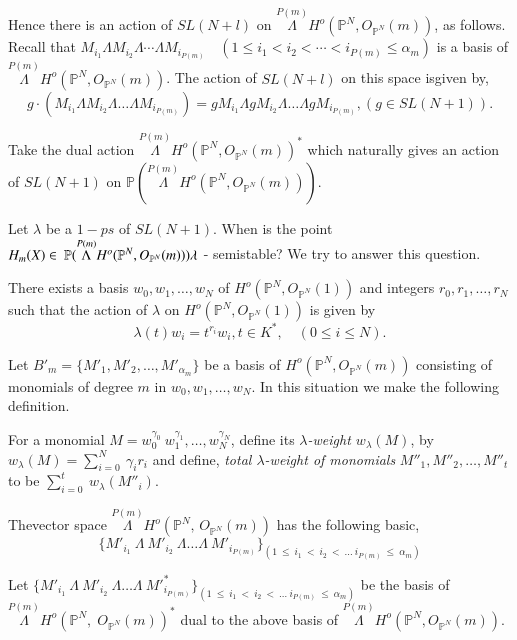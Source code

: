{\begin{subdefin}
Hence there is an action of $SL(N+l)$ on $\overset{P(m)}{\Lambda}
H^o(\mathbb{P}^N, O_{\mathbb{P}^N}(m))$, as follows. Recall that
$M_{i_1} \Lambda M_{i_2} \Lambda \cdots \Lambda M_{i_{P(m)}} \quad (1
\le i_1 < i_2 < \cdots < i_{P(m)} \le \alpha_m)$ is a basis of
$\overset{P(m)}{\Lambda} H^o(\mathbb{P}^N,O_{\mathbb{P}^N}(m))$. The
action of $SL(N+l)$ on this space is\pageoriginale given by, 
$$
g \cdot (M_{i_1} \Lambda M_{i_2} \Lambda \dots \Lambda M_{i_{P(m)}}) =
gM_{i_1} \Lambda  gM_{i_2} \Lambda \dots \Lambda
gM_{i_{P(m)}}, (g \in SL(N+1)). 
$$

Take the dual action $\overset{P(m)}{\Lambda}
H^o(\mathbb{P}^N,O_{\mathbb{P}^N}(m))^*$ which naturally gives an
action of $SL(N+1)$ on $\mathbb{P}(\overset{P(m)}{\Lambda}
H^o(\mathbb{P}^N,O_{\mathbb{P}^N}(m)))$. 

Let $\lambda$ be a $1-ps$ of $SL(N+1)$. When is the point $H_m(X)
\in~\mathbb{P}(\overset{P(m)}{\Lambda}\break
H^o(\mathbb{P}^N,O_{\mathbb{P}^N}(m)))\lambda$ - semistable? We try to
answer this question. 

There exists a basis $w_0,w_1,\ldots,w_N$ of
$H^o(\mathbb{P}^N,O_{\mathbb{P}^N}(1))$ and integers
$r_0,r_1,\ldots,r_N$ such that the action of $\lambda$ on
$H^o(\mathbb{P}^N,O_{\mathbb{P}^N}(1))$ is given by  
$$
 \lambda(t)w_i = t^{r_i}w_i, t \in K^*, \quad (0\le i \le N).  
$$

Let $B'_m = \{M'_1,M'_2,\ldots,M'_{\alpha_m}\}$ be a basis of 
$H^o(\mathbb{P}^N,O_{\mathbb{P}^N}(m))$ consisting of monomials of
degree $m$ in $w_0,w_1,\ldots,w_N$. In this situation we make the
following definition. 
\end{subdefin}

\begin{subdefin}\label{chap0:subdef0.1.1}%
For a monomial $M =
w_0^{\gamma_0}~w_1^{\gamma_1},\ldots,w_N^{\gamma_N}$, define its {\em
  $\lambda$-weight $w_\lambda(M)$}, by $w_\lambda(M) =
\sum\limits_{i=0}^{N} ~\gamma_i r_i$ and define, {\em total
  $\lambda$-weight of monomials} $M''_1,M''_2,\ldots,M''_t$ to be
$\sum\limits_{i=0}^{t}~w_\lambda (M''_i)$. 
\end{subdefin}

The\pageoriginale vector space $\overset{P(m)}{\Lambda}
H^o(\mathbb{P}^N, \, O_{\mathbb{P}^N}(m))$ has the following basic, 
$$
\bigg\{M'_{i_1}~\Lambda~M'_{i_2}~\Lambda \ldots
\Lambda~M'_{i_{P(m)}}\bigg\}_{(1 ~\le ~i_1~ < ~i_2 ~<~ \ldots
  ~i_{P(m)} ~\le~ \alpha_{m})}  
$$

\noindent
Let $\{M'_{i_{1}}~\Lambda~M'_{i_{2}}~\Lambda \ldots 
\Lambda~{M'}^*_{i_{P(m)}} \}_{(1~\le ~i_1~ < ~i_2 ~<~ \ldots
    ~i_{P(m)}  ~\le~ \alpha_{m})}$ be the basis of
  $\overset{P(m)}{\Lambda} 
H^o(\mathbb{P}^N, \; O_{\mathbb{P}^N}(m))^*$ dual to the above basis of
$\overset{P(m)}{\Lambda} H^o(\mathbb{P}^N,O_{\mathbb{P}^N}(m))$. 

}
